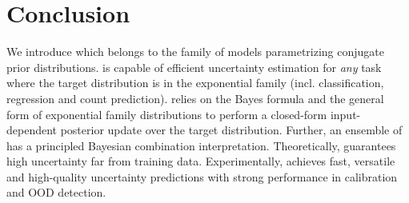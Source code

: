 \section{Conclusion}

We introduce \NatPN{} which belongs to the family of models parametrizing conjugate prior distributions.
\NatPNacro{} is capable of efficient uncertainty estimation for \emph{any} task where the target distribution is in the exponential family (incl. classification, regression and count prediction). \NatPNacro{} relies on the Bayes formula and the general form of exponential family distributions to perform a closed-form input-dependent posterior update over the target distribution. Further, an ensemble of  has a principled Bayesian combination interpretation. Theoretically, \NatPNacro{} guarantees high uncertainty far from training data. Experimentally, \NatPNacro{} achieves fast, versatile and high-quality uncertainty predictions with strong performance in calibration and OOD detection.

